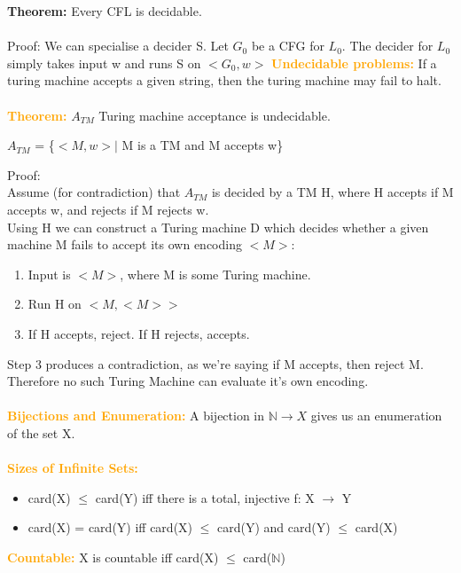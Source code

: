 \documentclass[a4paper,10pt]{article}
\begin{document}
\textcolor{Peach}{\textbf{Theorem:}} Every CFL is decidable. \\\\
Proof: We can specialise a decider S. Let $G_{0}$ be a CFG for $L_{0}$. The decider for $L_{0}$ simply takes input w and runs S on $<G_{0}, w>$
\newpage
\noindent \textcolor{Orange}{\textbf{Undecidable problems:}} If a turing machine accepts a given string, then the turing machine may fail to halt.   \\\\
\textcolor{Orange}{\textbf{Theorem:}} $A_{TM}$ Turing machine acceptance is undecidable. \\
\begin{center}
$A_{TM}$ = \{$<M,w> | $ M is a TM and M accepts w\}
\end{center}
Proof: \\ 
Assume (for contradiction) that $A_{TM}$ is decided by a TM H, where H accepts if M accepts w, and rejects if M rejects w. \\ 
Using H we can construct a Turing machine D which decides whether a given machine M fails to accept its own encoding $<M>$: 
\begin{enumerate}
\item Input is $<M>$, where M is some Turing machine. 
\item Run H on $<M, <M>>$
\item If H accepts, reject. If H rejects, accepts. 
\end{enumerate}
Step 3 produces a contradiction, as we're saying if M accepts, then reject M. Therefore no such Turing Machine can evaluate it's own encoding. \\\\
\textcolor{Orange}{\textbf{Bijections and Enumeration:}} A bijection in $\mathbb{N} \rightarrow X$ gives us an enumeration of the set X. \\\\
\textcolor{Orange}{\textbf{Sizes of Infinite Sets:}}
\renewcommand{\labelitemi}{\textperiodcentered}
\begin{itemize}
\item card(X) $\leq$ card(Y) iff there is a total, injective f: X $\rightarrow$ Y 
\item card(X) = card(Y) iff card(X) $\leq$ card(Y) and card(Y) $\leq$ card(X)
\end{itemize}
\textcolor{Orange}{\textbf{Countable:}} X is countable iff card(X) $\leq$ card($\mathbb{N}$) \\\\
\end{document}
